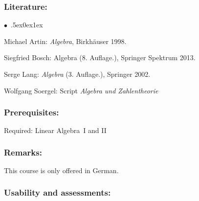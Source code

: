 \documentclass[a4paper,10pt]{article}
\renewenvironment{itemize}{\begin{list}{$\bullet$\ }{\itemsep.5ex\setlength{\topsep}{0.5\itemsep}\parsep0ex\labelsep1ex\settowidth{\labelwidth}{$\bullet$\ }\setlength{\leftmargin}{\labelwidth}\addtolength{\leftmargin}{3ex}\addtolength{\leftmargin}{\labelsep}}}{\end{list}}
\begin{document}
\subsubsection*{\large
    Literature:
}
\begin{itemize}
\item Michael Artin: \emph{Algebra}, Birkhäuser 1998.
\item Siegfried Bosch: Algebra (8. Auf\/lage.), Springer Spektrum 2013.
\item Serge Lang: \emph{Algebra} (3. Auf\/lage.), Springer 2002.
\item Wolfgang Soergel: Script \emph{Algebra und Zahlentheorie}
\end{itemize}
\subsubsection*{\large
    Prerequisites:
}
Required: Linear Algebra~I and II
\subsubsection*{\large
    Remarks:
}
This course is only offered in German.
\subsubsection*{\large
    Usability and assessments:
}
\end{document}
